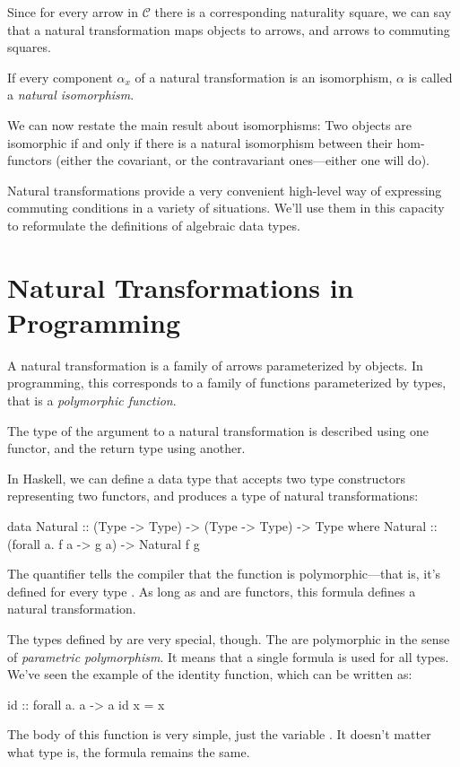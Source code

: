 \documentclass[DaoFP]{subfiles}
\begin{document}
Since for every arrow in $\mathcal{C}$ there is a corresponding naturality square, we can say that a natural transformation maps objects to arrows, and arrows to commuting squares.

If every component $\alpha_x$ of a natural transformation is an isomorphism, $\alpha$ is called a \emph{natural isomorphism}. 

We can now restate the main result about isomorphisms: Two objects are isomorphic if and only if there is a natural isomorphism between their hom-functors (either the covariant, or the contravariant ones---either one will do).

Natural transformations provide a very convenient high-level way of expressing commuting conditions in a variety of situations. We'll use them in this capacity to reformulate the definitions of algebraic data types.

\section{Natural Transformations in Programming}

A natural transformation is a family of arrows parameterized by objects. In programming, this corresponds to a family of functions parameterized by types, that is a \emph{polymorphic function}. 

The type of the argument to a natural transformation is described using one functor, and the return type using another. 

In Haskell, we can define a data type that accepts two type constructors representing two functors, and produces a type of natural transformations:

\begin{haskell}
data Natural :: (Type -> Type) -> (Type -> Type) -> Type where
  Natural :: (forall a. f a -> g a) -> Natural f g
\end{haskell}
The  quantifier tells the compiler that the function is polymorphic---that is, it's defined for every type . As long as  and  are functors, this formula defines a natural transformation. 

The types defined by  are very special, though. The are polymorphic in the sense of \emph{parametric polymorphism}. It means that a single formula is used for all types. We've seen the example of the identity function, which can be written as:
\begin{haskell}
id :: forall a. a -> a
id x = x
\end{haskell}
The body of this function is very simple, just the variable . It doesn't matter what type  is, the formula remains the same.
\end{document}
